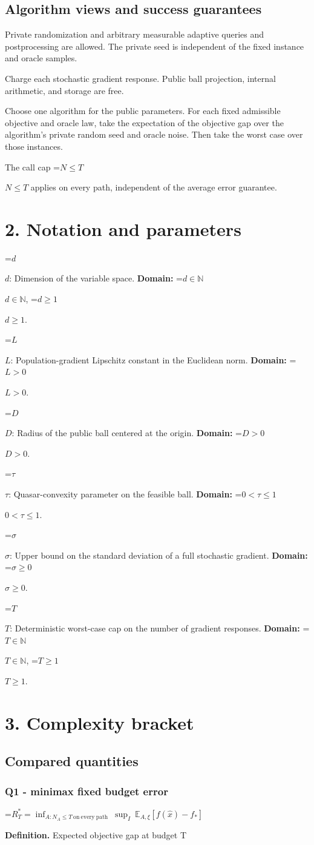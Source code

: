 \documentclass[10pt,a4paper]{article}
\newcommand{\AtlasMath}[1]{\par\begingroup\centering\setbox0=\hbox{$\displaystyle #1$}\ifdim\wd0>1.4\linewidth\typeout{ATLAS WIDE FORMULA: \the\wd0}\fi\ifdim\wd0>\linewidth\resizebox{\linewidth}{!}{\box0}\else\box0\fi\par\endgroup}
\newcommand{\AtlasInlineMath}[1]{\begingroup\setbox0=\hbox{$#1$}\ifdim\wd0>.4\linewidth\endgroup\AtlasMath{#1}\else\endgroup$#1$\fi}
\begin{document}
\subsection{Algorithm views and success guarantees}
Private randomization and arbitrary measurable adaptive queries and postprocessing are allowed. The private seed is independent of the fixed instance and oracle samples.

Charge each stochastic gradient response. Public ball projection, internal arithmetic, and storage are free.

Choose one algorithm for the public parameters. For each fixed admissible objective and oracle law, take the expectation of the objective gap over the algorithm's private random seed and oracle noise. Then take the worst case over those instances.

The call cap \AtlasInlineMath{N\le T} applies on every path, independent of the average error guarantee.

\section{2. Notation and parameters}
\AtlasInlineMath{d}: Dimension of the variable space. \textbf{Domain:} \AtlasInlineMath{d\in\mathbb N}, \AtlasInlineMath{d\ge1}.

\AtlasInlineMath{L}: Population-gradient Lipschitz constant in the Euclidean norm. \textbf{Domain:} \AtlasInlineMath{L>0}.

\AtlasInlineMath{D}: Radius of the public ball centered at the origin. \textbf{Domain:} \AtlasInlineMath{D>0}.

\AtlasInlineMath{\tau}: Quasar-convexity parameter on the feasible ball. \textbf{Domain:} \AtlasInlineMath{0<\tau\le1}.

\AtlasInlineMath{\sigma}: Upper bound on the standard deviation of a full stochastic gradient. \textbf{Domain:} \AtlasInlineMath{\sigma\ge0}.

\AtlasInlineMath{T}: Deterministic worst-case cap on the number of gradient responses. \textbf{Domain:} \AtlasInlineMath{T\in\mathbb N}, \AtlasInlineMath{T\ge1}.

\section{3. Complexity bracket}
\subsection{Compared quantities}
\subsubsection{Q1 - minimax fixed budget error}
\AtlasMath{R_T^*=\inf_{A:N_A\le T\ \mathrm{on\ every\ path}}\ \sup_I\ \mathbb E_{A,\xi}[f(\widehat x)-f_*]}
\textbf{Definition.} Expected objective gap at budget T
\end{document}

